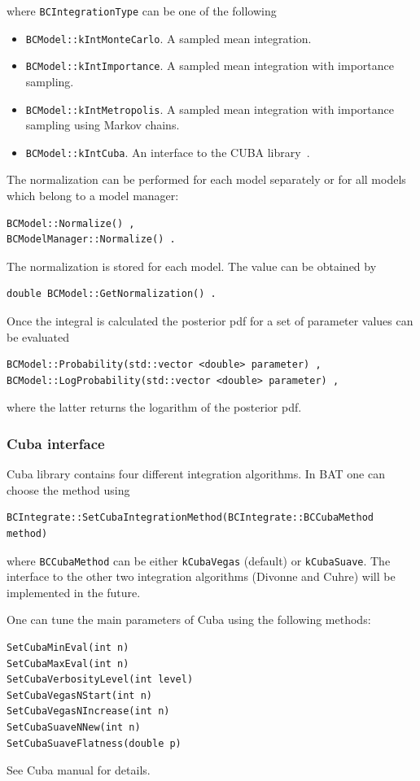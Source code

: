 \documentclass[11pt, a4paper]{article}
\begin{document}
\noindent
where \verb|BCIntegrationType| can be one of the following
%
\begin{itemize}
\item \verb|BCModel::kIntMonteCarlo|. A sampled mean integration.
\item \verb|BCModel::kIntImportance|. A sampled mean integration
 with importance sampling.
\item \verb|BCModel::kIntMetropolis|. A sampled mean integration
 with importance sampling using Markov chains.
\item \verb|BCModel::kIntCuba|. An interface to the CUBA
  library~\cite{CUBA,CUBAweb}.
\end{itemize}
%

\noindent
The normalization can be performed for each model separately or for
all models which belong to a model manager:
%
\begin{verbatim}
BCModel::Normalize() ,
BCModelManager::Normalize() .
\end{verbatim}

\noindent
The normalization is stored for each model. The value can be obtained
by
%
\begin{verbatim}
double BCModel::GetNormalization() .
\end{verbatim}

\noindent
Once the integral is calculated the posterior pdf for a set of
parameter values can be evaluated
%
\begin{verbatim}
BCModel::Probability(std::vector <double> parameter) ,
BCModel::LogProbability(std::vector <double> parameter) ,
\end{verbatim}
%
where the latter returns the logarithm of the posterior pdf.

\subsubsection{Cuba interface}
\label{section:cubainterface}

Cuba library contains four different integration algorithms. In BAT
one can choose the method using
%
\begin{verbatim}
BCIntegrate::SetCubaIntegrationMethod(BCIntegrate::BCCubaMethod method)
\end{verbatim}
%
where \verb|BCCubaMethod| can be either \verb|kCubaVegas| (default)
or \verb|kCubaSuave|. The interface to the other two integration
algorithms (Divonne and Cuhre) will be implemented in the future.

\noindent
One can tune the main parameters of Cuba using the following methods:
%
\begin{verbatim}
SetCubaMinEval(int n)
SetCubaMaxEval(int n)
SetCubaVerbosityLevel(int level)
SetCubaVegasNStart(int n)
SetCubaVegasNIncrease(int n)
SetCubaSuaveNNew(int n)
SetCubaSuaveFlatness(double p)
\end{verbatim}
%
See Cuba manual for details.
\end{document}
